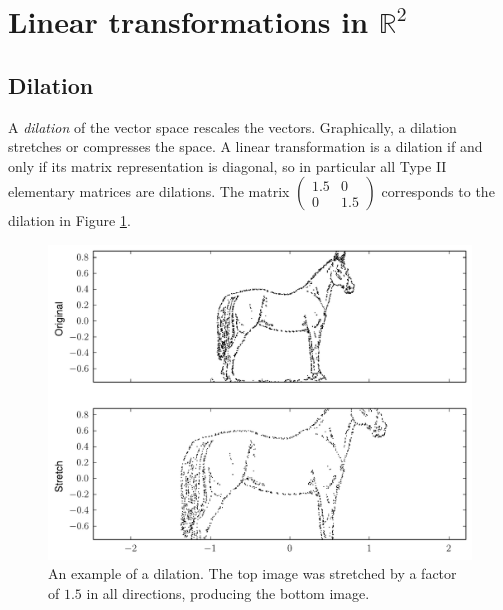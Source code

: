 \label{lab:ChangeBasis}

\section*{Linear transformations in $\mathbb{R}^2$}
\subsection*{Dilation}
A \emph{dilation} of the vector space rescales the vectors. Graphically, a dilation stretches or compresses the space. A linear transformation is a dilation if and only if its matrix representation is diagonal, so in particular all Type II elementary matrices are dilations. The matrix $\begin{pmatrix}
1.5 & 0\\
0 & 1.5 \end{pmatrix}$ corresponds to the dilation in Figure \ref{fig:dilation}.
\begin{figure}
\includegraphics[width=\textwidth]{stretch.pdf}
\caption{An example of a dilation. The top image was stretched by a factor of $1.5$ in all directions, producing the bottom image.}
\label{fig:dilation}
\end{figure}

